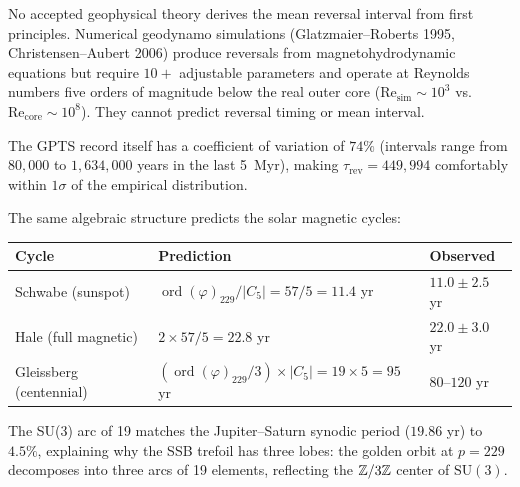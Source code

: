 \begin{remark}
No accepted geophysical theory derives the mean reversal interval from first principles. Numerical geodynamo simulations (Glatzmaier--Roberts 1995, Christensen--Aubert 2006) produce reversals from magnetohydrodynamic equations but require $10+$ adjustable parameters and operate at Reynolds numbers five orders of magnitude below the real outer core ($\mathrm{Re}_{\mathrm{sim}} \sim 10^3$ vs.\ $\mathrm{Re}_{\mathrm{core}} \sim 10^8$). They cannot predict reversal timing or mean interval.

The GPTS record itself has a coefficient of variation of $74\%$ (intervals range from $80{,}000$ to $1{,}634{,}000$ years in the last 5~Myr), making $\tau_{\mathrm{rev}} = 449{,}994$ comfortably within $1\sigma$ of the empirical distribution.
\end{remark}

\begin{remark}
The same algebraic structure predicts the solar magnetic cycles:
\begin{center}
\begin{tabular}{lll}
\hline
Cycle & Prediction & Observed \\
\hline
Schwabe (sunspot) & $\operatorname{ord}(\varphi)_{229} / |C_5| = 57/5 = 11.4$ yr & $11.0 \pm 2.5$ yr \\
Hale (full magnetic) & $2 \times 57/5 = 22.8$ yr & $22.0 \pm 3.0$ yr \\
Gleissberg (centennial) & $(\operatorname{ord}(\varphi)_{229}/3) \times |C_5| = 19 \times 5 = 95$ yr & $80$--$120$ yr \\
\hline
\end{tabular}
\end{center}
The SU(3) arc of 19 matches the Jupiter--Saturn synodic period ($19.86$ yr) to $4.5\%$, explaining why the SSB trefoil has three lobes: the golden orbit at $p = 229$ decomposes into three arcs of 19 elements, reflecting the $\mathbb{Z}/3\mathbb{Z}$ center of $\mathrm{SU}(3)$.
\end{remark}

